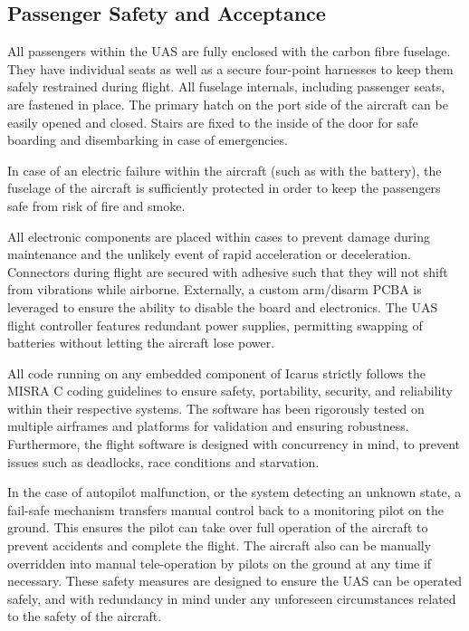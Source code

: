 \clearpage

\subsection{Passenger Safety and Acceptance}
\label{sec:safety}

All passengers within the UAS are fully enclosed with the carbon fibre fuselage. They
have individual seats as well as a secure four-point harnesses to keep them safely
restrained during flight. All fuselage internals, including passenger seats, are 
fastened in place. The primary hatch on the port side of the aircraft can be easily 
opened and closed. Stairs are fixed to the inside of the door for safe boarding and 
disembarking in case of emergencies.

In case of an electric failure within the aircraft (such as with the battery), the
fuselage of the aircraft is sufficiently protected in order to keep the passengers
safe from risk of fire and smoke.

All electronic components are placed within cases to prevent damage during maintenance
and the unlikely event of rapid acceleration or deceleration. Connectors during flight
are secured with adhesive such that they will not shift from vibrations while airborne.
Externally, a custom arm/disarm PCBA is leveraged to ensure the ability to disable
the board and electronics. The UAS flight controller features redundant power supplies,
permitting swapping of batteries without letting the aircraft lose power.

All code running on any embedded component of Icarus strictly follows the MISRA C coding
guidelines to ensure safety, portability, security, and reliability within their
respective systems. The software has been rigorously tested on multiple airframes and
platforms for validation and ensuring robustness. Furthermore, the flight software is
designed with concurrency in mind, to prevent issues such as deadlocks, race conditions
and starvation.

In the case of autopilot malfunction, or the system detecting an unknown state, a 
fail-safe mechanism transfers manual control back to a monitoring pilot on the ground.
This ensures the pilot can take over full operation of the aircraft to prevent
accidents and complete the flight. The aircraft also can be manually overridden into
manual tele-operation by pilots on the ground at any time if necessary. These safety
measures are designed to ensure the UAS can be operated safely, and with redundancy
in mind under any unforeseen circumstances related to the safety of the aircraft.